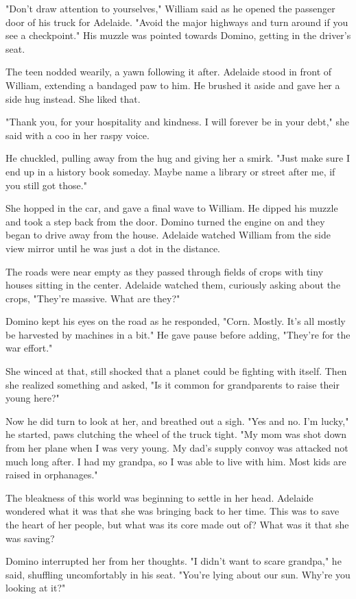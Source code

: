 "Don't draw attention to yourselves," William said as he opened the passenger door of his truck for Adelaide. "Avoid the major highways and turn around if you see a checkpoint." His muzzle was pointed towards Domino, getting in the driver's seat.

The teen nodded wearily, a yawn following it after. Adelaide stood in front of William, extending a bandaged paw to him. He brushed it aside and gave her a side hug instead. She liked that.

"Thank you, for your hospitality and kindness. I will forever be in your debt," she said with a coo in her raspy voice.

He chuckled, pulling away from the hug and giving her a smirk. "Just make sure I end up in a history book someday. Maybe name a library or street after me, if you still got those."

She hopped in the car, and gave a final wave to William. He dipped his muzzle and took a step back from the door. Domino turned the engine on and they began to drive away from the house. Adelaide watched William from the side view mirror until he was just a dot in the distance.

The roads were near empty as they passed through fields of crops with tiny houses sitting in the center. Adelaide watched them, curiously asking about the crops, "They're massive. What are they?"

Domino kept his eyes on the road as he responded, "Corn. Mostly. It's all mostly be harvested by machines in a bit." He gave pause before adding, "They're for the war effort."

She winced at that, still shocked that a planet could be fighting with itself. Then she realized something and asked, "Is it common for grandparents to raise their young here?"

Now he did turn to look at her, and breathed out a sigh. "Yes and no. I'm lucky," he started, paws clutching the wheel of the truck tight. "My mom was shot down from her plane when I was very young. My dad's supply convoy was attacked not much long after. I had my grandpa, so I was able to live with him. Most kids are raised in orphanages."

The bleakness of this world was beginning to settle in her head. Adelaide wondered what it was that she was bringing back to her time. This was to save the heart of her people, but what was its core made out of? What was it that she was saving?

Domino interrupted her from her thoughts. "I didn't want to scare grandpa," he said, shuffling uncomfortably in his seat. "You're lying about our sun. Why're you looking at it?"

